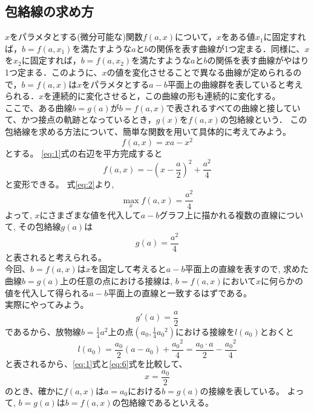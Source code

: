 \documentclass[11pt,a4j,fleqn]{jarticle}
\begin{document}
\subsection{包絡線の求め方}
$x$をパラメタとする(微分可能な)関数$f(a,x)$について，$x$をある値$x_1$に固定すれば，$b=f(a,x_1)$を満たすような$a$と$b$の関係を表す曲線が1つ定まる．同様に、$x$を$x_2$に固定すれば，$b=f(a,x_2)$を満たすような$a$と$b$の関係を表す曲線がやはり1つ定まる．このように、$x$の値を変化させることで異なる曲線が定められるので，$b=f(a,x)$は$x$をパラメタとする$a-b$平面上の曲線群を表していると考えられる．$x$を連続的に変化させると，この曲線の形も連続的に変化する。\\
ここで、ある曲線$b=g(a)$が$b=f(a,x)$で表されるすべての曲線と接していて、かつ接点の軌跡となっているとき，$g(x)$を$f(a,x)$の包絡線という．
この包絡線を求める方法について、簡単な関数を用いて具体的に考えてみよう。\\
\begin{equation}
f(a, x) = x a - x^2\label{eq:1}
\end{equation}
とする。
\eqref{eq:1}式の右辺を平方完成すると
\begin{equation}
f(a,  x) = -\left(x - \frac{a}{2}\right)^2 + \frac{a^2}{4} \label{eq:2}
\end{equation}
と変形できる。
式\eqref{eq:2}より, 
\begin{equation} 
\max_{x}f(a, x) = \frac{a^2}{4} \label{eq:3}
\end{equation}
よって, $x$にさまざまな値を代入して$a-b$グラフ上に描かれる複数の直線について, その包絡線$g(a)$は
\begin{equation} 
g(a) = \frac{a^2}{4} \label{eq:4}
\end{equation}
と表されると考えられる。\\
今回、$b=f(a, x)$は$x$を固定して考えると$a-b$平面上の直線を表すので, 求めた曲線$b=g(a)$上の任意の点における接線は, $b=f(a, x)$において$x$に何らかの値を代入して得られる$a-b$平面上の直線と一致するはずである。\\
実際にやってみよう。
\begin{equation} 
g'(a) = \frac{a}{2} \label{eq:5}
\end{equation}
であるから、放物線$b=\frac{1}{4}a^2$上の点$(a_0,\frac{1}{4}{a_0}^2 )$における接線を$l(a_0)$とおくと\\
\begin{equation} 
l(a_0)=\frac{a_0}{2}(a-a_0)+\frac{{a_0}^2}{4}=\frac{a_0 \cdot a}{2} - \frac{{a_0}^2}{4} \label{eq:6}
\end{equation}
と表されるから、\eqref{eq:1}式と\eqref{eq:6}式を比較して、
\begin{equation*} 
x = \frac{a_0}{2}
\end{equation*}
のとき、確かに$f(a,  x)$は$a=a_0$における$b=g(a)$の接線を表している。
よって, $b=g(a)$は$b=f(a,x)$の包絡線であるといえる。\\
\end{document}
